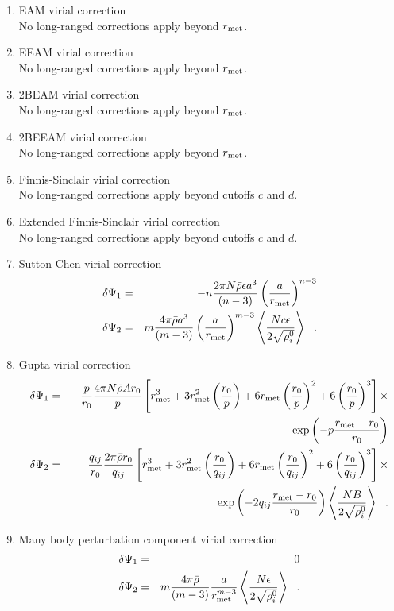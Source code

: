 \begin{enumerate}
\item EAM virial correction \\
No long-ranged corrections apply beyond $r_{\rm met}$.
\item EEAM virial correction \\
No long-ranged corrections apply beyond $r_{\rm met}$.
\item 2BEAM virial correction \\
No long-ranged corrections apply beyond $r_{\rm met}$.
\item 2BEEAM virial correction \\
No long-ranged corrections apply beyond $r_{\rm met}$.
\item Finnis-Sinclair virial correction \\
No long-ranged corrections apply beyond cutoffs $c$ and $d$.
\item Extended Finnis-Sinclair virial correction \\
No long-ranged corrections apply beyond cutoffs $c$ and $d$.
\item Sutton-Chen virial correction
\begin{eqnarray}
\delta \Psi_{1} &=& -n \frac{2 \pi N \bar{\rho} \epsilon a^{3}}{(n-3)}
\left( \frac{a}{r_{\rm met}} \right)^{n-3} \nonumber \\
\delta \Psi_{2} &=& m \frac{4 \pi \bar{\rho} a^{3}}{(m-3)} \left( \frac{a}{r_{\rm met}} \right)^{m-3}
\left< \frac{N c \epsilon}{2\sqrt{\rho_{i}^{0}}} \right>~~.
\end{eqnarray}
\item Gupta virial correction
\begin{eqnarray}
\delta \Psi_{1} &=& -\frac{p}{r_{0}} \frac{4 \pi N \bar{\rho} A r_{0}}{p}
\left[ r_{\rm met}^{3} + 3 r_{\rm met}^{2} \left(\frac{r_{0}}{p}\right) +
6 r_{\rm met} \left(\frac{r_{0}}{p}\right)^{2} + 6 \left(\frac{r_{0}}{p}\right)^{3} \right] \times \nonumber \\
& & \exp \left( -p \frac{r_{\rm met}-r_{0}}{r_{0}}\right) \nonumber \\
\delta \Psi_{2} &=& \frac{q_{ij}}{r_{0}} \frac{2 \pi \bar{\rho} r_{0}}{q_{ij}}
\left[ r_{\rm met}^{3} + 3 r_{\rm met}^{2} \left(\frac{r_{0}}{q_{ij}}\right) +
6 r_{\rm met} \left(\frac{r_{0}}{q_{ij}}\right)^{2} + 6 \left(\frac{r_{0}}{q_{ij}}\right)^{3} \right] \times \\
& & \exp \left( -2 q_{ij} \frac{r_{\rm met}-r_{0}}{r_{0}}\right)
\left< \frac{N B}{2\sqrt{\rho_{i}^{0}}} \right>~~. \nonumber
\end{eqnarray}
\item Many body perturbation component virial correction
\begin{eqnarray}
\delta \Psi_{1} &=& 0 \nonumber \\
\delta \Psi_{2} &=& m \frac{4 \pi \bar{\rho}}{(m-3)} \frac{a}{r_{\rm met}^{m-3}}
\left< \frac{N \epsilon}{2\sqrt{\rho_{i}^{0}}} \right>~~.
\end{eqnarray}
\end{enumerate}

